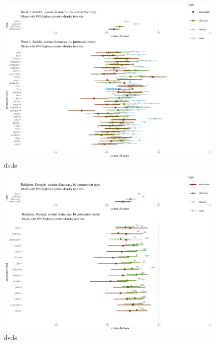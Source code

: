 \documentclass[
  10pt,
  dvipsnames,enabledeprecatedfontcommands]{scrartcl}
\begin{document}
\begin{figure}


\begin{center}\includegraphics[width=1.1\linewidth]{paperDraft6_files/figure-latex/unnamed-chunk-6-1} \end{center}
\caption{dsds}
\label{fig:weat1reddit}
\end{figure}

\begin{figure}


\begin{center}\includegraphics[width=1.1\linewidth]{paperDraft6_files/figure-latex/unnamed-chunk-7-1} \end{center}
\caption{dsds}
\label{fig:religionGoogle}
\end{figure}
\end{document}
